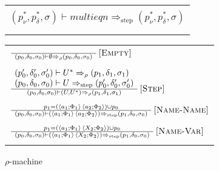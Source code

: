 \documentclass[a4paper,UKenglish]{lipics-v2016}
\makeatletter
\newenvironment*{premises}{\begin{array}{@{}l@{}}}{\end{array}}
\newcommand*{\infrule}[2]{\frac{\hspace{1ex}\vphantom{()}#1\hspace{1ex}}{\hspace{1ex}\vphantom{()}#2\hspace{1ex}}}
\newcommand*{\RNAME}[1]{\,\ensuremath{\textsc{[#1]}}}
\newcommand{\clos}[2] {
  \langle #1; #2 \rangle
}
\newcommand{\rframe}[7] {
  (#1, #2, #3) \vdash #4 \Rightarrow_\rho (#5, #6, #7)
}
\newcommand{\sframe}[7] {
  (#1, #2, #3) \vdash #4 \Rightarrow_\textrm{step} (#5, #6, #7)
}
\newcommand{\pr}[2] {
 (#1\, #2)
}
\makeatother
\begin{document}
    \begin{figure}
  \caption{$\rho$-machine}\label{table:rmachine}
   \begin{minipage}[b]{\textwidth}
  \begin{tabular}{c}
    \fbox{\begin{varwidth}{\textwidth}
        $\rframe{p_\nu^*}{p_\delta^*}{\sigma}{multieqn^*}{p_\nu^*}{p_\delta^*}{\sigma}$ \\
        $\sframe{p_\nu^*}{p_\delta^*}{\sigma}{multieqn}{p_\nu^*}{p_\delta^*}{\sigma}$ \\
        \end{varwidth}} \\ \\
  \end{tabular}
  \end{minipage}

  \begin{minipage}[b]{\textwidth}
  \begin{tabular}{l}

      $\infrule{
      }{
            \rframe{p_0}{\delta_0}{\sigma_0}{\emptyset}{p_0}{\delta_0}{\sigma_0}
      }\RNAME{Empty} $ \\ \\

    $\infrule{%
    \begin{premises}
    \rframe{p_0'}{\delta_0'}{\sigma_0'}{U^*}{p_1}{\delta_1}{\sigma_1} \\
    \sframe{p_0}{\delta_0}{\sigma_0}{U}{p_0'}{\delta_0'}{\sigma_0'}
    \end{premises}
    }{\rframe{p_0}{\delta_0}{\sigma_0}{(U, U^*)}{p_1}{\delta_1}{\sigma_1}}
    \RNAME{Step}$ \\ \\

    $\infrule{%
    p_1 = \pr{\clos{a_1}{\Phi_1}}{\clos{a_2}{\Phi_2}} \cup p_0
    }{\sframe{p_0}{\delta_0}{\sigma_0}{\pr{\clos{a_1}{\Phi_1}}{\clos{a_2}{\Phi_2}}}{p_1}{\delta_0}{\sigma_0}}
    \RNAME{Name-Name}$ \\ \\

    $\infrule{%
    p_1 = \pr{\clos{a_1}{\Phi_1}}{\clos{X_2}{\Phi_2}} \cup p_0
    }{\sframe{p_0}{\delta_0}{\sigma_0}{\pr{\clos{a_1}{\Phi_1}}{\clos{X_2}{\Phi_2}}}{p_1}{\delta_0}{\sigma_0}}
    \RNAME{Name-Var}$ \\ \\


\end{tabular}
\end{minipage}
\end{figure}
\end{document}
